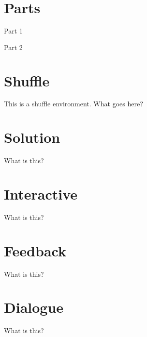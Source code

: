 \documentclass{ximera}
\begin{document}
\section{Parts}

\begin{parts}
\item Part 1
\item Part 2
\end{parts}



\section{Shuffle}

\begin{shuffle}
This is a shuffle environment. What goes here?
\end{shuffle}



\section{Solution}

\begin{solution}
What is this?
\end{solution}



\section{Interactive}

\begin{interactive}
What is this?
\end{interactive}



\section{Feedback}

\begin{feedback}
What is this?
\end{feedback}



\section{Dialogue}

\begin{dialogue}
What is this?
\end{dialogue}
\end{document}
